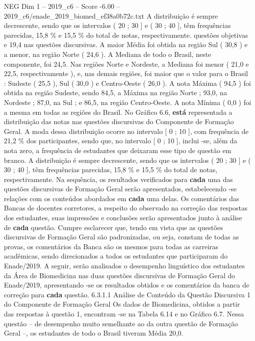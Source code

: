 \begin{textsample}{NEG Dim 1 – 2019\_c6 – Score -6.00 – 2019\_c6/enade\_2019\_biomed\_ef38a0b72c.txt}
A distribuição é sempre decrescente, sendo que os intervalos ( 20 ; 30 ] e ( 30 ; 40 ], têm frequências parecidas, 15,8 \% e 15,5 \% do total de notas, respectivamente. questões objetivas e 19,4 nas questões discursivas.
A maior Média foi obtida na região Sul ( 30,8 ) e a menor, na região Norte ( 24,6 ).
A Mediana de todo o Brasil, neste componente, foi 24,5.
Nas regiões Norte e Nordeste, a Mediana foi menor ( 21,0 e 22,5, respectivamente ), e, nas demais regiões, foi maior que o valor para o Brasil : Sudeste ( 25,5 ), Sul ( 30,0 ) e Centro-Oeste ( 26,0 ).
A nota Máxima ( 94,5 ) foi obtida na região Sudeste, sendo 84,5, a Máxima na região Norte ; 93,0, na Nordeste ; 87,0, na Sul ; e 86,5, na região Centro-Oeste.
A nota Mínima ( 0,0 ) foi a mesma em todas as regiões do Brasil.
No Gráfico 6.6, \textbf{está} representada a distribuição das notas nas questões discursivas do Componente de Formação Geral.
A moda dessa distribuição ocorre no intervalo [ 0 ; 10 ], com frequência de 21,2 \% dos participantes, sendo que, no intervalo [ 0 ; 10 ], inclui -se, além da nota zero, a frequência de estudantes que deixaram esse tipo de questão em branco.
A distribuição é sempre decrescente, sendo que os intervalos ( 20 ; 30 ] e ( 30 ; 40 ], têm frequências parecidas, 15,8 \% e 15,5 \% do total de notas, respectivamente.
Na sequência, os resultados verificados para \textbf{cada} uma das questões discursivas de Formação Geral serão apresentados, estabelecendo -se relações com os conteúdos abordados em \textbf{cada} uma delas.
Os comentários das Bancas de docentes corretores, a respeito do observado na correção das respostas dos estudantes, suas impressões e conclusões serão apresentados junto à análise de \textbf{cada} questão.
Cumpre esclarecer que, tendo em vista que as questões discursivas de Formação Geral são padronizadas, ou seja, constam de todas as provas, os comentários da Banca são os mesmos para todas as carreiras acadêmicas, sendo direcionados a todos os estudantes que participaram do Enade/2019.
A seguir, serão analisados o desempenho linguístico dos estudantes da Área de Biomedicina nas duas questões discursivas de Formação Geral do Enade/2019, apresentando -se os resultados obtidos e os comentários da banca de correção para \textbf{cada} questão. 6.3.1.1 Análise de Conteúdo da Questão Discursiva 1 do Componente de Formação Geral Os dados de Biomedicina, obtidos a partir das respostas à questão 1, encontram -se na Tabela 6.14 e no Gráfico 6.7.
Nessa questão – de desempenho muito semelhante ao da outra questão de Formação Geral –, os estudantes de todo o Brasil tiveram Média 20,0.

\end{textsample}
